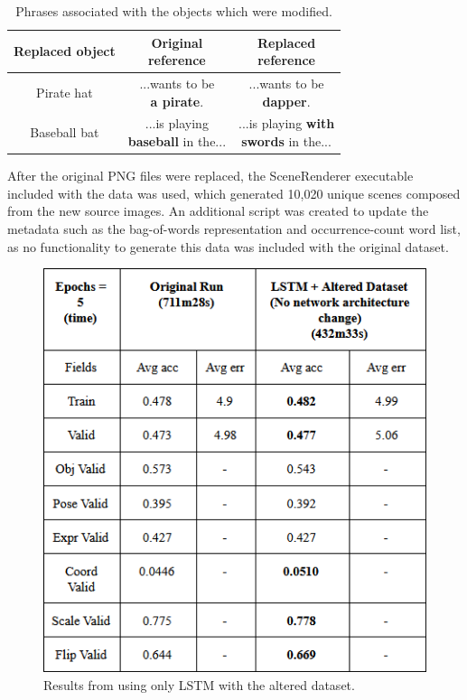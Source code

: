 \documentclass[10pt,twocolumn,letterpaper]{article}
\begin{document}
\begin{table}
\begin{center}
\begin{tabular}{|c|c|c|}
\hline
Replaced object &\makecell{ Original \\reference} & \makecell{Replaced \\  reference}\\
\hline\hline\hline
Pirate hat & \makecell{...wants to be \\\textbf{a pirate}}. & \makecell{...wants to be\\ \textbf{dapper}}.\\
\hline
Baseball bat & \makecell{...is playing \\\textbf{baseball} in the...} & \makecell{...is playing \textbf{with}\\ \textbf{swords} in the...} \\
\hline
\end{tabular}
\end{center}
\caption{Phrases associated with the objects which were modified.}
\label{phrasereplace}
\end{table}

 After the original PNG files were replaced, the SceneRenderer executable included with the data was used, which generated 10,020 unique scenes composed from the new source images. An additional script was created to update the metadata such as the bag-of-words representation and occurrence-count word list, as no functionality to generate this data was included with the original dataset.

\begin{figure}[t]
\begin{center}
   \includegraphics[width=0.8\linewidth]{dsetplot.png}
\end{center}
   \caption{Results from using only LSTM with the altered dataset.}
\label{dsetplot}
\end{figure}
\end{document}
